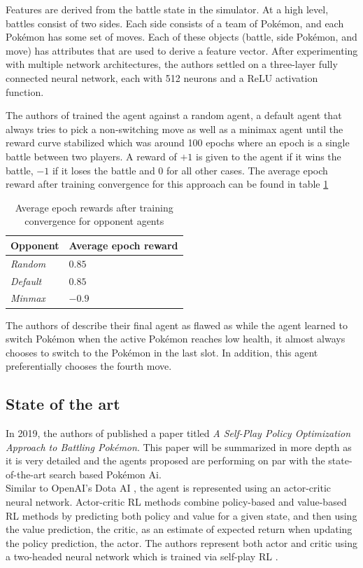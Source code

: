 Features are derived from the battle state in the simulator. At a high level, battles consist of two
sides. Each side consists of a team of Pokémon, and each Pokémon has some set of moves. Each of these 
objects (battle, side Pokémon, and move) has attributes that are used to derive a feature vector.
After experimenting with multiple network architectures, the authors settled on a three-layer 
fully connected neural network, each with 512 neurons and a ReLU activation function.

The authors of \cite{GottaTrainEmAll} trained the agent against a random agent, a default agent 
that always tries to pick a non-switching move as well as a minimax agent
until the reward curve stabilized which was around 100 epochs where an epoch is a single battle between
two players. A reward of $+1$ is given to the agent if it wins the battle, $-1$ if it loses the battle and
$0$ for all other cases. The average epoch reward after training convergence for this approach can
be found in table \ref{tbl:Gotta-Performance}
\begin{table}[h]
    \centering
        \begin{tabular}{|l|l|}
            \hline
            Opponent & Average epoch reward \\
            \hline
            \emph{Random} & $0.85$ \\
            \hline
            \emph{Default} & $0.85$ \\
            \hline
            \emph{Minmax} & $-0.9$ \\
            \hline
        \end{tabular}
        \caption{Average epoch rewards after training convergence for opponent agents \cite{GottaTrainEmAll}}
        \label{tbl:Gotta-Performance}
\end{table}
The authors of \cite{GottaTrainEmAll} describe their final agent as flawed as while the agent learned 
to switch Pokémon when the active Pokémon reaches low health, it almost always chooses to switch to the
Pokémon in the last slot. In addition, this agent preferentially chooses the fourth move. 

\subsection{State of the art}
In 2019, the authors of \cite{Huang_Lee_2019} published a paper titled \emph{A Self-Play Policy 
Optimization Approach to Battling Pokémon}. This paper will be summarized in more depth as it
is very detailed and the agents proposed are performing on par with the state-of-the-art
search based Pokémon Ai.\\
Similar to
OpenAI's Dota AI \cite{OpenAI_dota}, the agent is represented using an actor-critic neural network.
Actor-critic RL methods \cite{Konda_Tsitsiklis}
combine policy-based and value-based RL methods by predicting both policy and value for a given 
state, and then using the value prediction, the \glqq critic\grqq, as an estimate of expected
return when updating the policy prediction, the \glqq actor\grqq. The authors represent both
actor and critic using a two-headed neural network which is trained via self-play RL
\cite{Huang_Lee_2019}.


